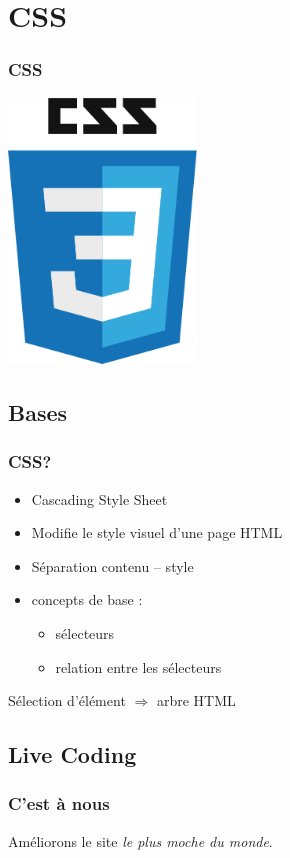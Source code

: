 \documentclass{beamer}
\begin{document}
	\section{CSS}
	\begin{frame}
		\frametitle{CSS}
		\centering \includegraphics[width=5cm]{images/css3.png} 
    \end{frame}
	
	\subsection{Bases}
    \begin{frame}
    	\frametitle{CSS?}
		\begin{itemize}
			\item Cascading Style Sheet
			\item Modifie le style visuel d'une page HTML
			\item Séparation contenu -- style
			\item concepts de base : 
				\begin{itemize}
					\item sélecteurs
					\item relation entre les sélecteurs
				\end{itemize}
		\end{itemize}

		\vspace{1cm}
		\centering Sélection d'élément $\Rightarrow$ arbre HTML		
		
    \end{frame}
	
	\subsection{Live Coding}
	    \begin{frame}
    	\frametitle{C'est à nous}
		\centering Améliorons le site \emph{le plus moche du monde}.
    \end{frame}
	
\end{document}
